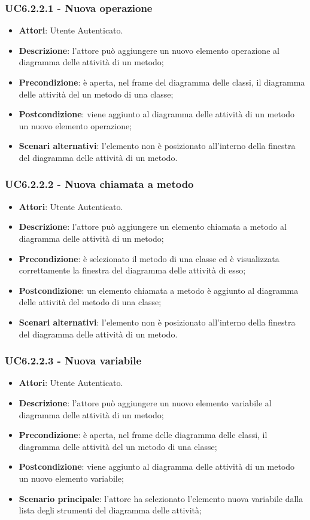 \subsubsection{UC6.2.2.1 - Nuova operazione} 
\label{sssec:UC6.2.2.1} 
\begin{itemize} 
\item \textbf{Attori}: Utente Autenticato.
\item \textbf{Descrizione}: l'attore può aggiungere un nuovo elemento operazione al diagramma delle attività di un metodo;
\item \textbf{Precondizione}: è aperta, nel frame del diagramma delle  classi, il diagramma delle attività del un metodo di una classe;
\item \textbf{Postcondizione}: viene aggiunto al diagramma delle attività di un metodo un nuovo elemento operazione;
\item \textbf{Scenari alternativi}: l'elemento non è posizionato all'interno della finestra del diagramma delle attività di un metodo.
\end{itemize} 
\subsubsection{UC6.2.2.2 - Nuova chiamata a metodo} 
\label{sssec:UC6.2.2.2} 
\begin{itemize} 
\item \textbf{Attori}: Utente Autenticato.
\item \textbf{Descrizione}: l'attore può aggiungere un elemento chiamata a metodo al diagramma delle attività di un metodo;
\item \textbf{Precondizione}: è selezionato il metodo di una classe ed è visualizzata correttamente la finestra del diagramma delle attività di esso;
\item \textbf{Postcondizione}: un elemento chiamata a metodo è aggiunto al diagramma delle attività del metodo di una classe;
\item \textbf{Scenari alternativi}: l'elemento non è posizionato all'interno della finestra del diagramma delle attività di un metodo.
\end{itemize} 
\subsubsection{UC6.2.2.3 - Nuova variabile} 
\label{sssec:UC6.2.2.3} 
\begin{itemize} 
\item \textbf{Attori}: Utente Autenticato.
\item \textbf{Descrizione}: l'attore può aggiungere un nuovo elemento variabile al diagramma delle attività di un metodo;
\item \textbf{Precondizione}: è aperta, nel frame delle diagramma delle  classi, il diagramma delle attività del un metodo di una classe;
\item \textbf{Postcondizione}: viene aggiunto al diagramma delle attività di un metodo un nuovo elemento variabile;
\item \textbf{Scenario principale}: l'attore ha selezionato l'elemento nuova variabile dalla lista degli strumenti del diagramma delle attività;\end{itemize} 

